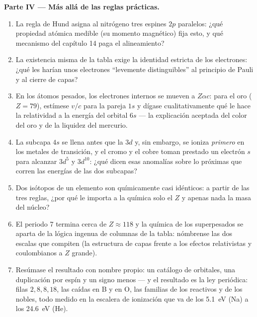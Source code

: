 \begin{problem}
\medskip\noindent\textbf{Parte IV --- Más allá de las reglas prácticas.}
\begin{enumerate}[resume]
  \item La regla de Hund asigna al nitrógeno tres espines $2p$ paralelos:
        ¿qué propiedad atómica medible (su momento magnético)
        fija esto, y qué mecanismo del capítulo 14 paga el
        alineamiento?
  \item La existencia misma de la tabla exige la identidad estricta de los
        electrones: ¿qué les harían unos electrones ``levemente
        distinguibles'' al principio de Pauli y al cierre de capas?
  \item En los átomos pesados, los electrones internos se mueven a
        $Z\alpha c$: para el oro ($Z = 79$), estímese $v/c$ para la pareja
        $1s$ y dígase cualitativamente qué le hace la relatividad a la
        energía del orbital $6s$ --- la explicación aceptada del color del
        oro y de la liquidez del mercurio.
  \item La subcapa $4s$ se llena antes que la $3d$ y, sin embargo, se
        ioniza \emph{primero} en los metales de transición, y el cromo y
        el cobre toman prestado un electrón $s$ para alcanzar $3d^5$ y
        $3d^{10}$: ¿qué dicen esas anomalías sobre lo próximas que corren
        las energías de las dos subcapas?
  \item Dos isótopos de un elemento son químicamente casi idénticos: a
        partir de las tres reglas, ¿por qué le importa a la química solo
        el $Z$ y apenas nada la masa del núcleo?
  \item El periodo 7 termina cerca de $Z \approx 118$ y la química de los
        superpesados se aparta de la lógica ingenua de columnas de la
        tabla: nómbrense las dos escalas que compiten (la estructura de capas
        frente a los efectos relativistas y coulombianos a $Z$ grande).
  \item Resúmase el resultado con nombre propio: un catálogo de orbitales,
        una duplicación por espín y un signo menos --- y el resultado es la
        ley periódica: filas $2, 8, 8, 18$, las caídas en B y en O, las
        familias de los reactivos y de los nobles, todo medido en la
        escalera de ionización que va de los \qty{5.1}{eV} (Na) a los
        \qty{24.6}{eV} (He).
\end{enumerate}
\end{problem}
